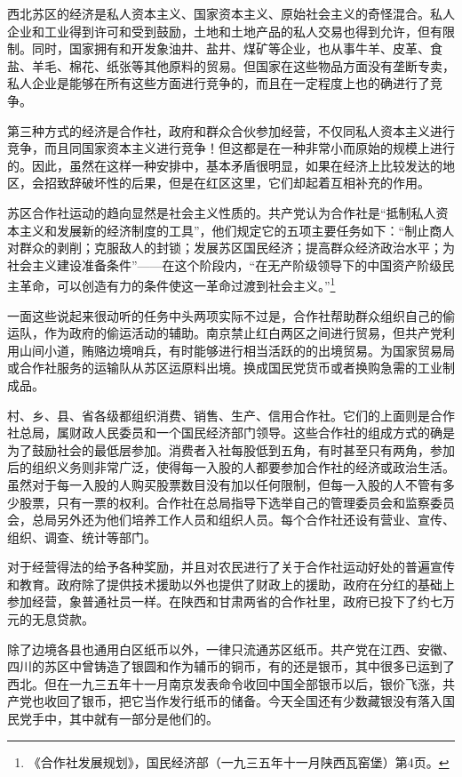 \documentclass[10pt]{book}
\begin{document}
西北苏区的经济是私人资本主义、国家资本主义、原始社会主义的奇怪混合。私人企业和工业得到许可和受到鼓励，土地和土地产品的私人交易也得到允许，但有限制。同时，国家拥有和开发象油井、盐井、煤矿等企业，也从事牛羊、皮革、食盐、羊毛、棉花、纸张等其他原料的贸易。但国家在这些物品方面没有垄断专卖，私人企业是能够在所有这些方面进行竞争的，而且在一定程度上也的确进行了竞争。

第三种方式的经济是合作社，政府和群众合伙参加经营，不仅同私人资本主义进行竞争，而且同国家资本主义进行竞争！但这都是在一种非常小而原始的规模上进行的。因此，虽然在这样一种安排中，基本矛盾很明显，如果在经济上比较发达的地区，会招致辞破坏性的后果，但是在红区这里，它们却起着互相补充的作用。

苏区合作社运动的趋向显然是社会主义性质的。共产党认为合作社是“抵制私人资本主义和发展新的经济制度的工具”，他们规定它的五项主要任务如下：“制止商人对群众的剥削；克服敌人的封锁；发展苏区国民经济；提高群众经济政治水平；为社会主义建设准备条件”——在这个阶段内，“在无产阶级领导下的中国资产阶级民主革命，可以创造有力的条件使这一革命过渡到社会主义。”\footnote{《合作社发展规划》，国民经济部（一九三五年十一月陕西瓦窑堡）第4页。}

一面这些说起来很动听的任务中头两项实际不过是，合作社帮助群众组织自己的偷运队，作为政府的偷运活动的辅助。南京禁止红白两区之间进行贸易，但共产党利用山间小道，贿赂边境哨兵，有时能够进行相当活跃的的出境贸易。为国家贸易局或合作社服务的运输队从苏区运原料出境。换成国民党货币或者换购急需的工业制成品。

村、乡、县、省各级都组织消费、销售、生产、信用合作社。它们的上面则是合作社总局，属财政人民委员和一个国民经济部门领导。这些合作社的组成方式的确是为了鼓励社会的最低层参加。消费者入社每股低到五角，有时甚至只有两角，参加后的组织义务则非常广泛，使得每一入股的人都要参加合作社的经济或政治生活。虽然对于每一入股的人购买股票数目没有加以任何限制，但每一入股的人不管有多少股票，只有一票的权利。合作社在总局指导下选举自己的管理委员会和监察委员会，总局另外还为他们培养工作人员和组织人员。每个合作社还设有营业、宣传、组织、调查、统计等部门。

对于经营得法的给予各种奖励，并且对农民进行了关于合作社运动好处的普遍宣传和教育。政府除了提供技术援助以外也提供了财政上的援助，政府在分红的基础上参加经营，象普通社员一样。在陕西和甘肃两省的合作社里，政府已投下了约七万元的无息贷款。

除了边境各县也通用白区纸币以外，一律只流通苏区纸币。共产党在江西、安徽、四川的苏区中曾铸造了银圆和作为辅币的铜币，有的还是银币，其中很多已运到了西北。但在一九三五年十一月南京发表命令收回中国全部银币以后，银价飞涨，共产党也收回了银币，把它当作发行纸币的储备。今天全国还有少数藏银没有落入国民党手中，其中就有一部分是他们的。
\end{document}
